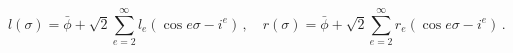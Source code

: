 \begin{equation}
l(\sigma )=\bar{\phi}+\sqrt{2}\sum_{e=2}^{\infty }l_{e}\left( \cos e\sigma
-i^{e}\right) \,,\quad r(\sigma )=\bar{\phi}+\sqrt{2}\sum_{e=2}^{\infty
}r_{e}\left( \cos e\sigma -i^{e}\right) \,.~~~~
\end{equation}

